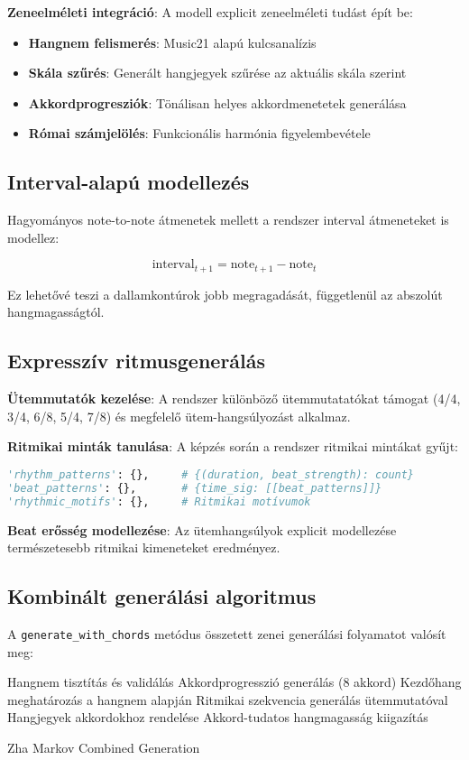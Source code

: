 \textbf{Zeneelméleti integráció}: A modell explicit zeneelméleti tudást épít be:
\begin{itemize}
\item \textbf{Hangnem felismerés}: Music21 alapú kulcsanalízis
\item \textbf{Skála szűrés}: Generált hangjegyek szűrése az aktuális skála szerint
\item \textbf{Akkordprogresziók}: Tönálisan helyes akkordmenetetek generálása
\item \textbf{Római számjelölés}: Funkcionális harmónia figyelembevétele
\end{itemize}

\subsection{Interval-alapú modellezés}
Hagyományos note-to-note átmenetek mellett a rendszer interval átmeneteket is modellez:

\[
\text{interval}_{t+1} = \text{note}_{t+1} - \text{note}_t
\]

Ez lehetővé teszi a dallamkontúrok jobb megragadását, függetlenül az abszolút hangmagasságtól.

\subsection{Expresszív ritmusgenerálás}
\textbf{Ütemmutatók kezelése}: A rendszer különböző ütemmutatatókat támogat (4/4, 3/4, 6/8, 5/4, 7/8) és megfelelő ütem-hangsúlyozást alkalmaz.

\textbf{Ritmikai minták tanulása}: A képzés során a rendszer ritmikai mintákat gyűjt:
\begin{lstlisting}[language=Python]
'rhythm_patterns': {},     # {(duration, beat_strength): count}
'beat_patterns': {},       # {time_sig: [[beat_patterns]]}
'rhythmic_motifs': {},     # Ritmikai motívumok
\end{lstlisting}

\textbf{Beat erősség modellezése}: Az ütemhangsúlyok explicit modellezése természetesebb ritmikai kimeneteket eredményez.

\subsection{Kombinált generálási algoritmus}
A \texttt{generate\_with\_chords} metódus összetett zenei generálási folyamatot valósít meg:

\begin{algorithm}[H]
\SetAlgoLined
{}

Hangnem tisztítás és validálás\;
Akkordprogresszió generálás (8 akkord)\;
Kezdőhang meghatározás a hangnem alapján\;
Ritmikai szekvencia generálás ütemmutatóval\;
Hangjegyek akkordokhoz rendelése\;
Akkord-tudatos hangmagasság kiigazítás\;

\caption{Zha Markov Combined Generation}
\end{algorithm}

